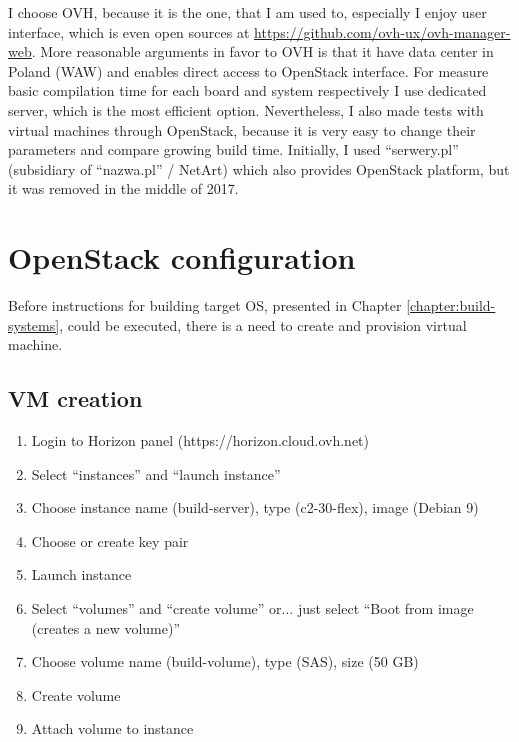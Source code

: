 \documentclass[printmode]{mgr}
\begin{document}
I choose OVH, because it is the one, that I am used to, especially I enjoy user interface, which is even open sources at \url{https://github.com/ovh-ux/ovh-manager-web}.
More reasonable arguments in favor to OVH is that it have data center in Poland (WAW) and enables direct access to OpenStack interface.
For measure basic compilation time for each board and system respectively I use dedicated server, which is the most efficient option.
Nevertheless, I also made tests with virtual machines through OpenStack, because it is very easy to change their parameters and compare growing build time.
Initially, I used ``serwery.pl'' (subsidiary of ``nazwa.pl'' / NetArt) which also provides OpenStack platform, but it was removed in the middle of 2017.


\section{OpenStack configuration}

Before instructions for building target OS, presented in Chapter \ref{chapter:build-systems}, could be executed, there is a need to create and provision virtual machine.





\subsection*{VM creation}

\begin{enumerate}
  \item Login to Horizon panel (https://horizon.cloud.ovh.net)
  \item Select ``instances'' and ``launch instance''
  \item Choose instance name (build-server), type (c2-30-flex), image (Debian 9)
  \item Choose or create key pair
  \item Launch instance
  \item Select ``volumes'' and ``create volume'' or... just select ``Boot from image (creates a new volume)'' 
  \item Choose volume name (build-volume), type (SAS), size (50 GB)
  \item Create volume
  \item Attach volume to instance
\end{enumerate}
\end{document}
